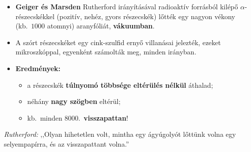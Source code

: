 \documentclass[12pt]{article}
\begin{document}
\begin{minipage}[t]{0.50\linewidth}\vspace{0pt}
\begin{itemize}
  \item \textbf{Geiger és Marsden} Rutherford irányításával radioaktív forrásból
    kilépő $\alpha$-részecskékkel (pozitív, nehéz, gyors részecskék) lőtték egy nagyon
    vékony (kb.\ $1000$ atomnyi) aranyfóliát, \textbf{vákuumban}.
  \item A szórt részecskéket egy cink-szulfid ernyő villanásai jelezték, ezeket
    mikroszkóppal, egyenként számolták meg, minden irányban.
  \item \textbf{Eredmények:}
    \begin{itemize}
      \item a részecskék \textbf{túlnyomó többsége eltérülés nélkül} áthalad;
      \item néhány \textbf{nagy szögben} eltérül;
      \item kb.\ minden $8000$.\ \textbf{visszapattan}!
    \end{itemize}
\end{itemize}
{\small\emph{Rutherford:} ,,Olyan hihetetlen volt, mintha egy ágyúgolyót lőttünk volna egy
selyempapírra, és az visszapattant volna.''}
\end{minipage}\hfill
\end{document}
